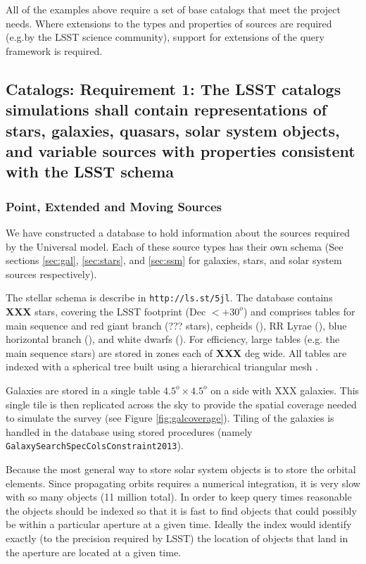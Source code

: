 \documentclass[]{article}
\begin{document}
{All of the examples above require a set of base catalogs that meet the project needs.  Where extensions to the types and
properties of sources are required (e.g.by the LSST science community), support for extensions of the query 
framework is required.  

\subsection{Catalogs: Requirement 1: The LSST catalogs simulations
  shall contain representations of stars, galaxies, quasars, solar
  system objects, and variable sources with properties consistent with the LSST schema}

\subsubsection{Point, Extended and Moving Sources}
We have constructed a database to hold information about the sources required by the Universal model.
Each of these source types has their own schema (See sections \ref{sec:gal}, \ref{sec:stars}, and \ref{sec:ssm} for galaxies, stars, and solar system sources respectively).

The stellar schema is describe in {\tt http://ls.st/5jl}.  The database contains {\bf XXX} stars, covering the LSST footprint (Dec $< +30^o$)
and comprises tables for main sequence and red giant branch (??? stars), cepheids (), RR Lyrae (), blue horizontal branch (), and white dwarfs ().
For efficiency, large tables (e.g. the main sequence stars) are stored in zones each of {\bf XXX} deg wide.  All tables are indexed with a spherical
tree built using a hierarchical triangular mesh \citep[HTM][]{htm}. 

Galaxies are stored in a single table $4.5^o \times 4.5^o$ on a side with XXX galaxies. This single tile is then replicated across the sky to 
provide the spatial coverage needed to simulate the survey (see Figure \ref{fig:galcoverage}).  
Tiling of the galaxies is handled in the database using stored procedures (namely {\tt GalaxySearchSpecColsConstraint2013}).

Because the most general way to store solar system objects is to store the orbital elements.  
Since propagating orbits requires a numerical integration, it is very slow with so many objects (11 million total).  
In order to keep query times reasonable the objects should be indexed so that  
it is fast to find objects that could possibly be within a particular aperture at a given time.  Ideally the index would identify 
exactly (to the precision required by LSST) the location of objects that land in the aperture are located at a given time.  

}
\end{document}
